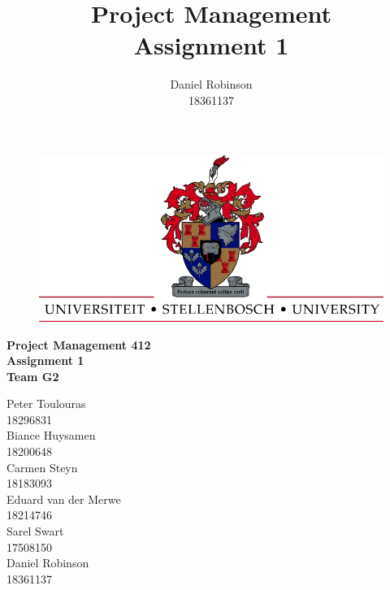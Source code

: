 


\title{Project Management\\Assignment 1}
\author{Daniel Robinson\\18361137}



    \begin{titlepage}
        \begin{center}
            \vspace*{1cm}
            
            \begin{figure}
			\centering
            \includegraphics[scale=2]{UScrest-top.jpg}
            \end{figure}
            
            \huge
            \textbf{Project Management 412\\Assignment 1\\Team G2}
            
            \vspace{1.5cm}
            
            \large
            Peter Toulouras\\
            18296831\\
            \vspace{0.5cm}
            Biance Huysamen\\
            18200648\\
            \vspace{0.5cm}
            Carmen Steyn\\
            18183093\\
            \vspace{0.5cm}
            Eduard van der Merwe\\
            18214746\\
            \vspace{0.5cm}
            Sarel Swart\\
            17508150\\
            \vspace{0.5cm}
            Daniel Robinson\\
            18361137\\
            \vspace{3.5cm}
            

\end{center}
\end{titlepage}
